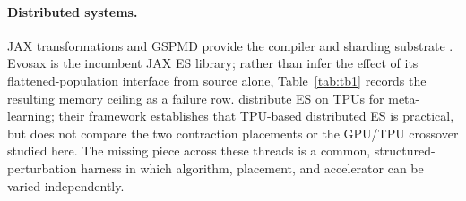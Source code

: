 \paragraph{Distributed systems.} JAX transformations and GSPMD provide the
compiler and sharding substrate \citep{jax2018,gspmd2021}. Evosax
\citep{lange2022evosax} is the incumbent JAX ES library; rather than infer the
effect of its flattened-population interface from source alone,
Table~\ref{tab:tb1} records the resulting memory ceiling as a failure row.
\citet{sheng2020tpu} distribute ES on TPUs for meta-learning; their framework
establishes that TPU-based distributed ES is practical, but does not compare
the two contraction placements or the GPU/TPU crossover studied here.
The missing piece across these threads is a common, structured-perturbation
harness in which algorithm, placement, and accelerator can be varied
independently.
